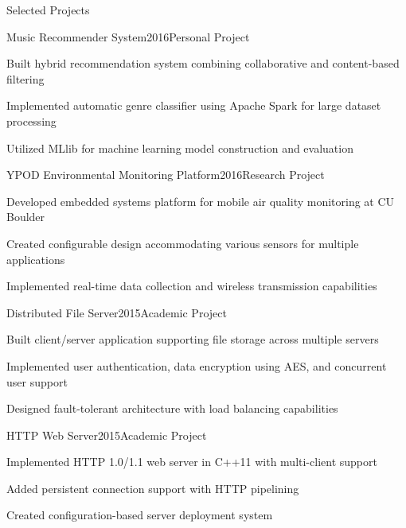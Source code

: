 
\begin{rSection}{Selected Projects}

\begin{rSubsection}{Music Recommender System}{2016}{Personal Project}{}
\item Built hybrid recommendation system combining collaborative and content-based filtering
\item Implemented automatic genre classifier using Apache Spark for large dataset processing
\item Utilized MLlib for machine learning model construction and evaluation
\end{rSubsection}

\begin{rSubsection}{YPOD Environmental Monitoring Platform}{2016}{Research Project}{}
\item Developed embedded systems platform for mobile air quality monitoring at CU Boulder
\item Created configurable design accommodating various sensors for multiple applications
\item Implemented real-time data collection and wireless transmission capabilities
\end{rSubsection}

\begin{rSubsection}{Distributed File Server}{2015}{Academic Project}{}
\item Built client/server application supporting file storage across multiple servers
\item Implemented user authentication, data encryption using AES, and concurrent user support
\item Designed fault-tolerant architecture with load balancing capabilities
\end{rSubsection}

\begin{rSubsection}{HTTP Web Server}{2015}{Academic Project}{}
\item Implemented HTTP 1.0/1.1 web server in C++11 with multi-client support
\item Added persistent connection support with HTTP pipelining
\item Created configuration-based server deployment system
\end{rSubsection}

\end{rSection}
